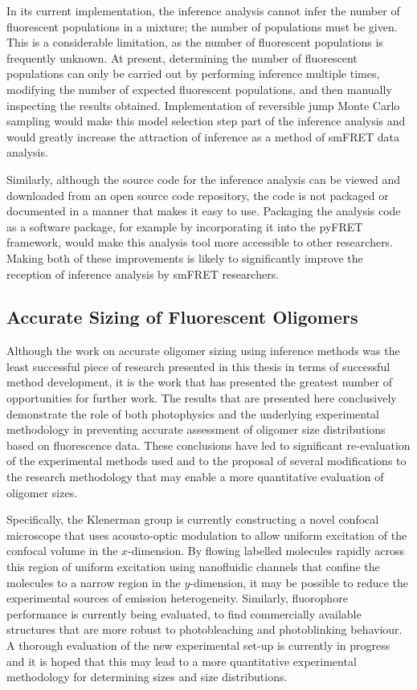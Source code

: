 In its current implementation, the inference analysis cannot infer the number of fluorescent populations in a mixture; the number of populations must be given. This is a considerable limitation, as the number of fluorescent populations is frequently unknown. At present, determining the number of fluorescent populations can only be carried out by performing inference multiple times, modifying the number of expected fluorescent populations, and then manually inspecting the results obtained. Implementation of reversible jump Monte Carlo sampling would make this model selection step part of the inference analysis and would greatly increase the attraction of inference as a method of smFRET data analysis. 

Similarly, although the source code for the inference analysis can be viewed and downloaded from an open source code repository, the code is not packaged or documented in a manner that makes it easy to use. Packaging the analysis code as a software package, for example by incorporating it into the pyFRET framework, would make this analysis tool more accessible to other researchers. Making both of these improvements is likely to significantly improve the reception of inference analysis by smFRET researchers.

\subsection{Accurate Sizing of Fluorescent Oligomers}
Although the work on accurate oligomer sizing using inference methods was the least successful piece of research presented in this thesis in terms of successful method development, it is the work that has presented the greatest number of opportunities for further work. The results that are presented here conclusively demonstrate the role of both photophysics and the underlying experimental methodology in preventing accurate assessment of oligomer size distributions based on fluorescence data. These conclusions have led to significant re-evaluation of the experimental methods used and to the proposal of several modifications to the research methodology that may enable a more quantitative evaluation of oligomer sizes.

Specifically, the Klenerman group is currently constructing a novel confocal microscope that uses acousto-optic modulation to allow uniform excitation of the confocal volume in the $x$-dimension. By flowing labelled molecules rapidly across this region of uniform excitation using nanofluidic channels that confine the molecules to a narrow region in the $y$-dimension, it may be possible to reduce the experimental sources of emission heterogeneity. Similarly, fluorophore performance is currently being evaluated, to find commercially available structures that are more robust to photobleaching and photoblinking behaviour. A thorough evaluation of the new experimental set-up is currently in progress and it is hoped that this may lead to a more quantitative experimental methodology for determining sizes and size distributions.

